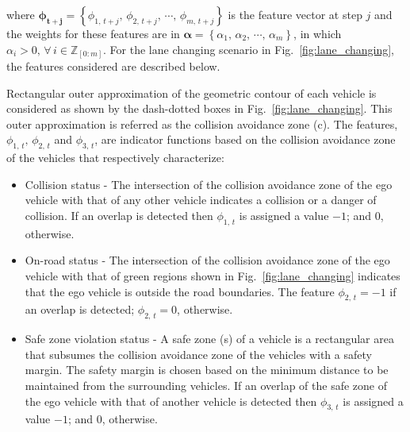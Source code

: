 \documentclass[10pt,journal]{IEEEtran}
\begin{document}
	\noindent where $\boldsymbol{{\phi}_{t+j}} = \left\{\phi_{1,\,{t+j}},\,\phi_{2,\,{t+j}},\,\cdots,\,\phi_{m,\,{t+j}}\right\}$ is the feature vector at step $j$ and the weights for these features are in  $\boldsymbol{{\alpha}} = \left\{\alpha_{1},\,\alpha_{2},\,\cdots,\,\alpha_{m}\right\}$, in which $\alpha_{i}>0,\,\forall \, i\in \mathbb{Z}_{\left[0:m\right]}$. For the lane changing scenario in  Fig.~\ref{fig:lane_changing}, the  features considered are described below. 
	
	Rectangular outer approximation of the geometric contour of each vehicle is considered as shown by the dash-dotted boxes in Fig.~\ref{fig:lane_changing}. This outer approximation is referred as the collision avoidance zone (c). The features, $\phi_{1,\,{t}},\,\phi_{2,\,{t}}$ and $\phi_{3,\,{t}}$, are indicator functions based on the collision avoidance zone of the vehicles that respectively characterize:
	\begin{itemize}
		\item Collision status - The intersection of the collision avoidance zone of the ego vehicle with that of any other vehicle indicates a collision or a danger of collision. If an overlap is detected then $\phi_{1,\,{t}}$ is assigned a value $-1$; and $0$, otherwise.
		
		\item On-road status - The intersection of the collision avoidance zone of the ego vehicle with that of green regions shown in Fig.~\ref{fig:lane_changing} indicates that the ego vehicle is outside the road boundaries. The feature $\phi_{2,\,{t}} = -1$ if an overlap is detected; $\phi_{2,\,{t}} = 0$, otherwise.
		
		\item Safe zone violation status - A safe zone (s) of a vehicle is a rectangular area that subsumes the collision avoidance zone of the vehicles with a safety margin. The safety margin is chosen based on the minimum distance to be maintained from the surrounding vehicles. If an overlap of the safe zone of the ego vehicle with that of another vehicle is detected then $\phi_{3,\,{t}}$ is assigned a value $-1$; and $0$, otherwise.		
		
		
	\end{itemize}
	 
\end{document}
